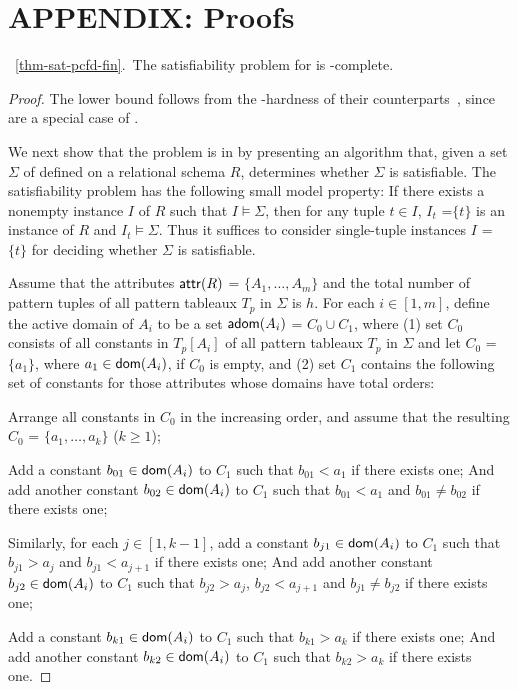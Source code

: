 \newpage
\section*{{\Large \sf APPENDIX: Proofs}}
\label{sec-appendix}

\noindent{}~\ref{thm-sat-pcfd-fin}.~The satisfiability
problem for \pCFDs is \NP-complete. \eop

\begin{proof}
The lower bound follows from the \NP-hardness of their \CFDs
counterparts~\cite{CFDs}, since \CFDs are a special case of \pCFDs.

We next show that the problem is in \NP by presenting an \NP
algorithm that, given a set $\Sigma$ of \pCFDs defined on a
relational schema $R$, determines whether $\Sigma$ is satisfiable.
The satisfiability problem has the following small model property:
If there exists a nonempty instance $I$ of $R$ such that
$I\models\Sigma$, then for any tuple $t\in I$, $I_t$ =$\{t\}$ is an
instance of $R$ and $I_t\models\Sigma$. Thus it suffices to consider
single-tuple instances $I$ = $\{t\}$ for deciding whether $\Sigma$
is satisfiable.

Assume \kwlog that the attributes $\protect\mathsf{attr}(R)$ = $\{A_1,\dots,
A_m\}$ and the total number of pattern tuples of all pattern
tableaux $T_p$ in $\Sigma$ is $h$. For each $i\in [1, m]$, define
the active domain of $A_i$ to be a set ${\mathsf{adom}}(A_i)$ = $C_0\cup C_1$,
where (1) set $C_0$ consists of all constants in $T_p[A_i]$ of all
pattern tableaux $T_p$ in $\Sigma$ and let $C_0$ = $\{a_1\}$, where
$a_1\in\protect\mathsf{dom}(A_i)$, if $C_0$ is empty, and (2) set $C_1$ contains the
following set of constants for those attributes whose domains have
total orders: \vspace{-0.5ex}\bi
\item Arrange all constants in $C_0$ in the increasing order, and
assume that the resulting $C_0$ = $\{a_1, \ldots, a_k\}$ ($k\ge 1$);
\item Add a constant $b_{01}\in\protect\mathsf{dom}(A_i)$ to $C_1$ such that $b_{01} < a_1$ if there
exists one; And add another constant $b_{02}\in\protect\mathsf{dom}(A_i)$ to $C_1$
such that $b_{01} < a_1$ and $b_{01}\ne b_{02}$ if there exists one;
\item Similarly, for each $j\in[1, k - 1]$, add a constant $b_{j1}\in\protect\mathsf{dom}(A_i)$ to $C_1$
such that $b_{j1} > a_j$ and $ b_{j1} < a_{j+1}$ if there exists
one; And add another constant $b_{j2}\in\protect\mathsf{dom}(A_i)$ to $C_1$ such
that $b_{j2} > a_j$, $ b_{j2} < a_{j+1}$ and $b_{j1}\ne b_{j2}$ if
there exists one;
\item Add a constant $b_{k1}\in\protect\mathsf{dom}(A_i)$ to $C_1$ such that $b_{k1} > a_k$ if there exists one;
And add another constant $b_{k2}\in\protect\mathsf{dom}(A_i)$ to $C_1$ such that
$b_{k2} > a_k$ if there exists one. \ei\vspace{-1.5ex}


\end{proof}
